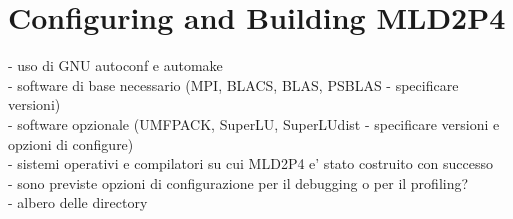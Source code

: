\section{Configuring and Building MLD2P4\label{sec:configuring}}
    - uso di GNU autoconf e automake \\
    - software di base necessario (MPI, BLACS, BLAS, PSBLAS - specificare versioni) \\
    - software opzionale (UMFPACK, SuperLU, SuperLUdist - specificare versioni e opzioni di configure) \\
    - sistemi operativi e compilatori su cui MLD2P4 e' stato costruito con successo \\
    - sono previste opzioni di configurazione per il debugging o per il profiling? \\
    - albero delle directory \\

